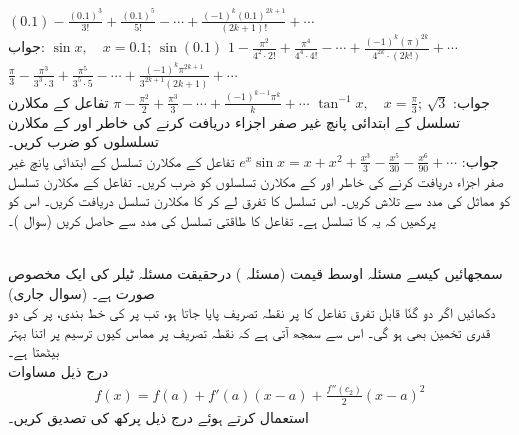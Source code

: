 $(0.1)-\frac{(0.1)^3}{3!}+\frac{(0.1)^5}{5!}-\cdots+\frac{(-1)^k(0.1)^{2k+1}}{(2k+1)!}+\cdots$\\
جواب:\quad
$\sin x,\quad x=0.1;\, \sin(0.1)$
$1-\frac{\pi^2}{4^2\cdot 2!}+\frac{\pi^4}{4^4\cdot 4!}-\cdots+\frac{(-1)^k(\pi)^{2k}}{4^{2k}\cdot (2k!)}+\cdots$
$\frac{\pi}{3}-\frac{\pi^3}{3^3\cdot 3}+\frac{\pi^5}{3^5\cdot 5}-\cdots+\frac{(-1)^k\pi^{2k+1}}{3^{2k+1}(2k+1)}+\cdots$\\
جواب:\quad
$\tan^{-1}x,\quad x=\tfrac{\pi}{3};\, \sqrt{3}$
$\pi-\frac{\pi^2}{2}+\frac{\pi^3}{3}-\cdots+\frac{(-1)^{k-1}\pi^k}{k}+\cdots$
تفاعل  کے مکلارن تسلسل کے ابتدائی پانچ غیر صفر اجزاء دریافت کرنے کی خاطر  اور  کے مکلارن تسلسلوں کو ضرب کریں۔ \\
جواب:\quad
$e^x\sin x=x+x^2+\tfrac{x^3}{3}-\tfrac{x^5}{30}-\tfrac{x^6}{90}+\cdots$
تفاعل  کے مکلارن تسلسل کے ابتدائی پانچ غیر صفر اجزاء دریافت کرنے کی خاطر  اور  کے مکلارن تسلسلوں کو  ضرب کریں۔ 
تفاعل  کے مکلارن تسلسل کو مماثل  کی مدد سے تلاش  کریں۔ اس تسلسل کا تفرق لے کر  کا مکلارن تسلسل دریافت کریں۔ اس کو پرکھیں کہ یہ  کا تسلسل ہے۔
تفاعل کا طاقتی تسلسل  کی مدد سے حاصل کریں (سوال )۔

\\
سمجھائیں کیسے مسئلہ اوسط قیمت (مسئلہ ) درحقیقت مسئلہ ٹیلر کی ایک مخصوص صورت ہے۔
 (سوال  جاری)\\
دکھائیں اگر دو گنّا قابل تفرق تفاعل  کا  پر  نقطہ تصریف پایا جاتا ہو، تب  پر  کی خط بندی،  پر کی دو قدری تخمین بھی ہو گی۔ اس سے سمجھ آتی ہے کہ نقطہ تصریف پر مماس کیوں ترسیم پر اتنا بہتر بیٹھتا ہے۔ 
\\
درج ذیل مساوات
\begin{align*}
f(x)=f(a)+f'(a)(x-a)+\frac{f''(c_2)}{2}(x-a)^2
\end{align*}
استعمال کرتے ہوئے درج ذیل پرکھ کی تصدیق کریں۔

